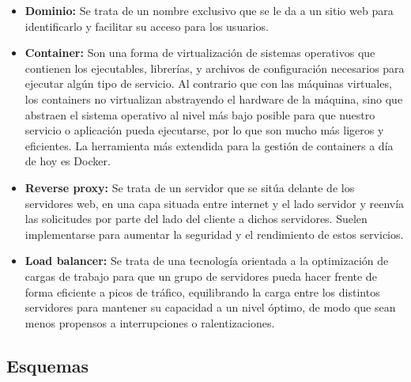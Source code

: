 \documentclass{article}
\begin{document}
\begin{itemize}
	\item \textbf{Dominio:} Se trata de un nombre exclusivo que se le da a un sitio web para identificarlo y facilitar su acceso para los usuarios.
	\item \textbf{Container:} Son una forma de virtualización de sistemas operativos que contienen los ejecutables, librerías, y archivos de configuración necesarios para ejecutar algún tipo de servicio. Al contrario que con las máquinas virtuales, los containers no virtualizan abstrayendo el hardware de la máquina, sino que abstraen el sistema operativo al nivel más bajo posible para que nuestro servicio o aplicación pueda ejecutarse, por lo que son mucho más ligeros y eficientes. La herramienta más extendida para la gestión de containers a día de hoy es Docker.
	\item \textbf{Reverse proxy:} Se trata de un servidor que se sitúa delante de los servidores web, en una capa situada entre internet y el lado servidor y reenvía las solicitudes por parte del lado del cliente a dichos servidores. Suelen implementarse para aumentar la seguridad y el rendimiento de estos servicios.
	\item \textbf{Load balancer:} Se trata de una tecnología orientada a la optimización de cargas de trabajo para que un grupo de servidores pueda hacer frente de forma eficiente a picos de tráfico, equilibrando la carga entre los distintos servidores para mantener su capacidad a un nivel óptimo, de modo que sean menos propensos a interrupciones o ralentizaciones.
\end{itemize}

\newpage
\subsection{Esquemas}
\label{sec:uml}
\end{document}
